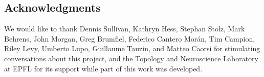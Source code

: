 
\subsection*{Acknowledgments} We would like to thank Dennis Sullivan, Kathryn Hess, Stephan Stolz, Mark Behrens, John Morgan, Greg Brumfiel, Federico Cantero Mor\'an, Tim Campion, Riley Levy, Umberto Lupo, Guillaume Tauzin, and Matteo Caorsi for stimulating conversations about this project, and the Topology and Neuroscience Laboratory at EPFL for its support while part of this work was developed.